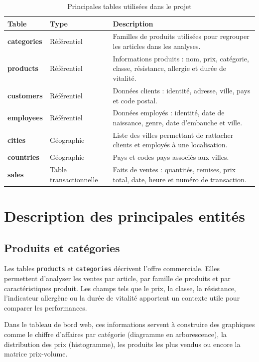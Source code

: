 \documentclass[12pt,a4paper,twoside]{report}
\begin{document}
\begin{table}[H]
\centering
{}
\begin{tabularx}{\textwidth}{>{\bfseries}p{3.1cm}p{3.2cm}X}
\toprule
\rowcolor{TableHeader}
\color{white}Table & \color{white}Type & \color{white}Description \\
\midrule
categories & Référentiel & Familles de produits utilisées pour regrouper les articles dans les analyses. \\
products & Référentiel & Informations produits : nom, prix, catégorie, classe, résistance, allergie et durée de vitalité. \\
customers & Référentiel & Données clients : identité, adresse, ville, pays et code postal. \\
employees & Référentiel & Données employés : identité, date de naissance, genre, date d'embauche et ville. \\
cities & Géographie & Liste des villes permettant de rattacher clients et employés à une localisation. \\
countries & Géographie & Pays et codes pays associés aux villes. \\
sales & Table transactionnelle & Faits de ventes : quantités, remises, prix total, date, heure et numéro de transaction. \\
\bottomrule
\end{tabularx}
\caption{Principales tables utilisées dans le projet}
\end{table}

\section{Description des principales entités}

\subsection{Produits et catégories}

Les tables \texttt{products} et \texttt{categories} décrivent l'offre commerciale. Elles permettent d'analyser les ventes par article, par famille de produits et par caractéristiques produit. Les champs tels que le prix, la classe, la résistance, l'indicateur allergène ou la durée de vitalité apportent un contexte utile pour comparer les performances.

Dans le tableau de bord web, ces informations servent à construire des graphiques comme le chiffre d'affaires par catégorie (diagramme en arborescence), la distribution des prix (histogramme), les produits les plus vendus ou encore la matrice prix-volume.
\end{document}
